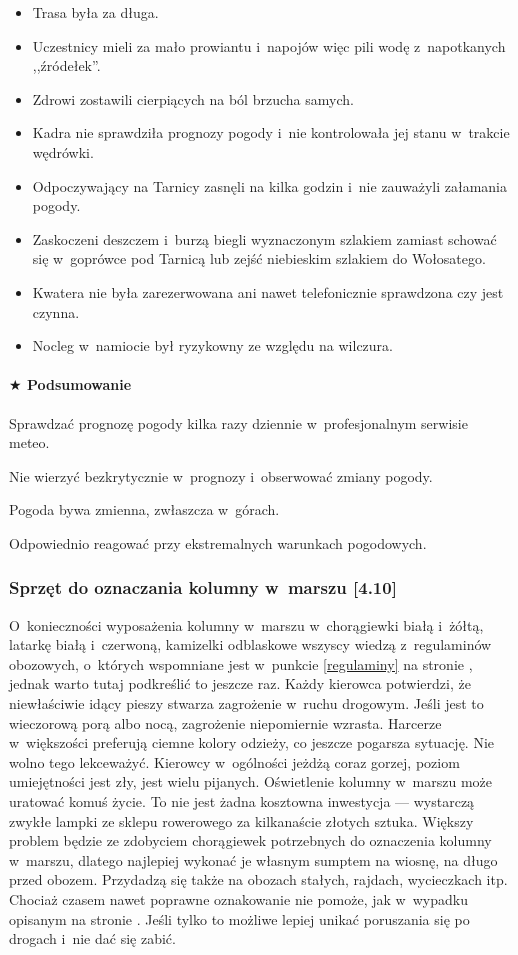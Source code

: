 \documentclass[a5paper,10pt,titlepage,twoside]{article}
\newcommand*{\thecheckbox}{\hss$\Box$} %
\newenvironment*{checklist}
{\list{}{%
\renewcommand*{\makelabel}[1]{\thecheckbox}}}
{\endlist}
\begin{document}
{{\begin{itemize}
\item Trasa była za długa.
\item Uczestnicy mieli za mało prowiantu i~napojów więc pili wodę z~napotkanych ,,źródełek''.
\item Zdrowi zostawili cierpiących na ból brzucha samych.
\item Kadra nie sprawdziła prognozy pogody i~nie kontrolowała jej stanu w~trakcie wędrówki.
\item Odpoczywający na Tarnicy zasnęli na kilka godzin i~nie zauważyli załamania pogody.
\item Zaskoczeni deszczem i~burzą biegli wyznaczonym szlakiem zamiast schować się w~goprówce pod Tarnicą lub zejść niebieskim szlakiem do Wołosatego.
\item Kwatera nie była zarezerwowana ani nawet telefonicznie sprawdzona czy jest czynna.
\item Nocleg w~namiocie był ryzykowny ze względu na wilczura.
\end{itemize}}}

\paragraph{$\bigstar$ Podsumowanie}
\begin{checklist}
\item Sprawdzać prognozę pogody kilka razy dziennie w~profesjonalnym serwisie meteo.
\item Nie wierzyć bezkrytycznie w~prognozy i~obserwować zmiany pogody.
\item Pogoda bywa zmienna, zwłaszcza w~górach.
\item Odpowiednio reagować przy ekstremalnych warunkach pogodowych.
\end{checklist}
\subsubsection{Sprzęt do oznaczania kolumny w~marszu [4.10]}
O~konieczności wyposażenia kolumny w~marszu w~chorągiewki białą i~żółtą, latarkę białą i~czerwoną, kamizelki odblaskowe wszyscy wiedzą z~regulaminów obozowych, o~których wspomniane jest w~punkcie \ref{regulaminy} na stronie \pageref{regulaminy}, jednak warto tutaj podkreślić to jeszcze raz. Każdy kierowca potwierdzi, że niewłaściwie idący pieszy stwarza zagrożenie w~ruchu drogowym. Jeśli jest to wieczorową porą albo nocą, zagrożenie niepomiernie wzrasta. Harcerze w~większości preferują ciemne kolory odzieży, co jeszcze pogarsza sytuację. Nie wolno tego lekceważyć. Kierowcy w~ogólności jeżdżą coraz gorzej, poziom umiejętności jest zły, jest wielu pijanych. Oświetlenie kolumny w~marszu może uratować komuś życie. To nie jest żadna kosztowna inwestycja --- wystarczą zwykłe lampki ze sklepu rowerowego za kilkanaście złotych sztuka. Większy problem będzie ze zdobyciem chorągiewek potrzebnych do oznaczenia kolumny w~marszu, dlatego najlepiej wykonać je własnym sumptem na wiosnę, na długo przed obozem. Przydadzą się także na obozach stałych, rajdach, wycieczkach itp. Chociaż czasem nawet poprawne oznakowanie nie pomoże, jak w~wypadku opisanym na stronie \pageref{pijany-wjechal-w-kolumne}. Jeśli tylko to możliwe lepiej unikać poruszania się po drogach i~nie dać się zabić.
\end{document}
